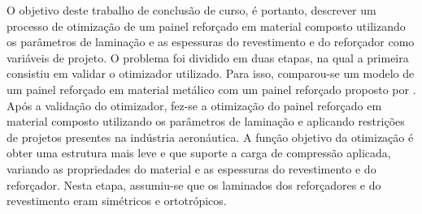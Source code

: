 O objetivo deste trabalho de conclusão de curso, é portanto, descrever um processo de otimização de um painel reforçado em material composto utilizando os parâmetros de laminação e as espessuras do revestimento e do reforçador como variáveis de projeto. O problema foi dividido em duas etapas, na qual a primeira consistiu em validar o otimizador utilizado. Para isso, comparou-se um modelo de um painel reforçado em material metálico com um painel reforçado proposto por \cite{niu1997airframe}. Após a validação do otimizador, fez-se a otimização do painel reforçado em material composto utilizando os parâmetros de laminação e aplicando restrições de projetos presentes na indústria aeronáutica. A função objetivo da otimização é obter uma estrutura mais leve e que suporte a carga de compressão aplicada, variando as propriedades do material e as espessuras do revestimento e do reforçador. Nesta etapa, assumiu-se que os laminados dos reforçadores e do revestimento eram simétricos e ortotrópicos.




